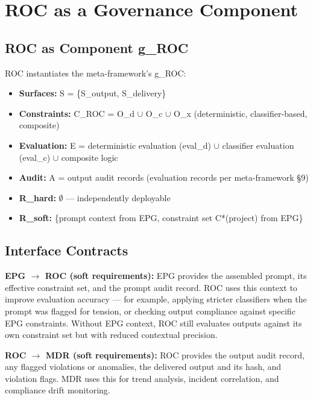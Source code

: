 \section{ROC as a Governance Component}
\label{sec:controls-7}


\subsection{ROC as Component g\_ROC}


ROC instantiates the meta-framework's g\_\allowbreak{}ROC:

\begin{itemize}
  \item \textbf{Surfaces:} S = \{S\_\allowbreak{}output, S\_\allowbreak{}delivery\}
  \item \textbf{Constraints:} C\_\allowbreak{}ROC = O\_\allowbreak{}d $\cup$ O\_\allowbreak{}c $\cup$ O\_\allowbreak{}x (deterministic, classifier-based, composite)
  \item \textbf{Evaluation:} E = deterministic evaluation (eval\_\allowbreak{}d) $\cup$ classifier evaluation (eval\_\allowbreak{}c) $\cup$ composite logic
  \item \textbf{Audit:} A = output audit records (evaluation records per meta-framework \S{}9)
  \item \textbf{R\_\allowbreak{}hard:} $\emptyset$ --- independently deployable
  \item \textbf{R\_\allowbreak{}soft:} \{prompt context from EPG, constraint set C*(project) from EPG\}
\end{itemize}


\subsection{Interface Contracts}


\textbf{EPG $\to$ ROC (soft requirements):} EPG provides the assembled prompt, its effective constraint set, and the prompt audit record. ROC uses this context to improve evaluation accuracy --- for example, applying stricter classifiers when the prompt was flagged for tension, or checking output compliance against specific EPG constraints. Without EPG context, ROC still evaluates outputs against its own constraint set but with reduced contextual precision.

\textbf{ROC $\to$ MDR (soft requirements):} ROC provides the output audit record, any flagged violations or anomalies, the delivered output and its hash, and violation flags. MDR uses this for trend analysis, incident correlation, and compliance drift monitoring.

